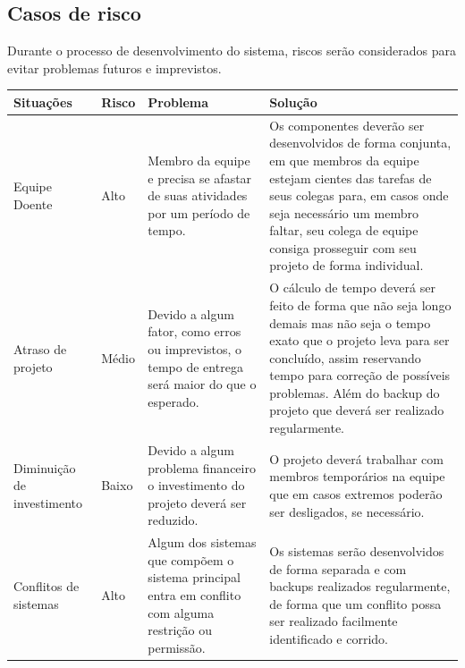 \documentclass{article}
\begin{document}
    \subsection{Casos de risco}
    Durante o processo de desenvolvimento do sistema, riscos serão considerados para evitar problemas futuros e imprevistos.
        \FloatBarrier
    \begin{table}[H]
      \begin{center}
        \begin{tabular}[pos]{|m{2.55cm}| m{1.2cm}| m{3.6cm}| m{6cm}|} 
          \hline
          \cellcolor[gray]{0.9}\textbf{Situações} & \cellcolor[gray]{0.9}\textbf{Risco} &
          \cellcolor[gray]{0.9}\textbf{Problema} &
          \cellcolor[gray]{0.9}\textbf{Solução} \\ \hline
          Equipe Doente & Alto & Membro da equipe e precisa se afastar de suas atividades por um período de tempo. & Os componentes deverão ser desenvolvidos de forma conjunta, em que membros da equipe estejam cientes das tarefas de seus colegas para, em casos onde seja necessário um membro faltar, seu colega de equipe consiga prosseguir com seu projeto de forma individual.  \\ \hline
           Atraso de projeto & Médio & Devido a algum fator, como erros ou imprevistos, o tempo de entrega será maior do que o esperado. & O cálculo de tempo deverá ser feito de forma que não seja longo demais mas não seja o tempo exato que o projeto leva para ser concluído, assim reservando tempo para correção de possíveis problemas. Além do backup do projeto que deverá ser realizado regularmente. \\ \hline
           Diminuição de investimento & Baixo & Devido a algum problema financeiro o investimento do projeto deverá ser reduzido. & O projeto deverá trabalhar com membros temporários na equipe que em casos extremos poderão ser desligados, se necessário. \\ \hline
            Conflitos de sistemas & Alto & Algum dos sistemas que compõem o sistema principal entra em conflito com alguma restrição ou permissão. & Os sistemas serão desenvolvidos de forma separada e com backups realizados regularmente, de forma que um conflito possa ser realizado facilmente identificado e corrido. \\ \hline
        \end{tabular}
      \end{center}
    \end{table}  
  
% 
% 
\end{document}

